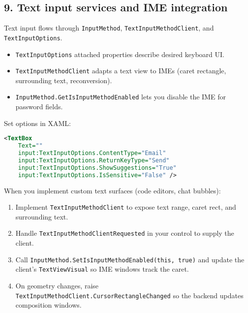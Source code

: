 \subsection{9. Text input services and IME
integration}\label{text-input-services-and-ime-integration}

Text input flows through \passthrough{\lstinline!InputMethod!},
\passthrough{\lstinline!TextInputMethodClient!}, and
\passthrough{\lstinline!TextInputOptions!}.

\begin{itemize}
\tightlist
\item
  \passthrough{\lstinline!TextInputOptions!} attached properties
  describe desired keyboard UI.
\item
  \passthrough{\lstinline!TextInputMethodClient!} adapts a text view to
  IMEs (caret rectangle, surrounding text, reconversion).
\item
  \passthrough{\lstinline!InputMethod.GetIsInputMethodEnabled!} lets you
  disable the IME for password fields.
\end{itemize}

Set options in XAML:

\begin{lstlisting}[language=XML]
<TextBox
    Text=""
    input:TextInputOptions.ContentType="Email"
    input:TextInputOptions.ReturnKeyType="Send"
    input:TextInputOptions.ShowSuggestions="True"
    input:TextInputOptions.IsSensitive="False" />
\end{lstlisting}

When you implement custom text surfaces (code editors, chat bubbles):

\begin{enumerate}
\def\labelenumi{\arabic{enumi}.}
\tightlist
\item
  Implement \passthrough{\lstinline!TextInputMethodClient!} to expose
  text range, caret rect, and surrounding text.
\item
  Handle \passthrough{\lstinline!TextInputMethodClientRequested!} in
  your control to supply the client.
\item
  Call
  \passthrough{\lstinline!InputMethod.SetIsInputMethodEnabled(this, true)!}
  and update the client's \passthrough{\lstinline!TextViewVisual!} so
  IME windows track the caret.
\item
  On geometry changes, raise
  \passthrough{\lstinline!TextInputMethodClient.CursorRectangleChanged!}
  so the backend updates composition windows.
\end{enumerate}

